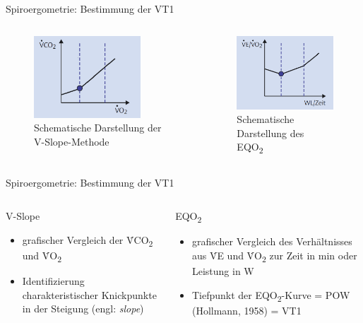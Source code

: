 \documentclass[colorBG,slideColor,9pt]{beamer}
\newcommand{\eqotwo}{EQO\textsubscript{2}}
\newcommand{\votwo}{\.{V}O\textsubscript{2}}
\newcommand{\vcotwo}{\.{V}CO\textsubscript{2}}
\newcommand{\ve}{\.{V}E}
\begin{document}
\begin{frame}{Spiroergometrie: Bestimmung der VT1}
\begin{columns}
\begin{column}{5cm}
\begin{figure}[H]
\begin{center}
\includegraphics[width=40mm]{Bilder/vslope.png}
\caption{Schematische Darstellung der V-Slope-Methode}
\end{center}
\end{figure}
\end{column}
\begin{column}{5cm}
\begin{figure}[H]
\begin{center}
\includegraphics[width=40mm]{Bilder/eqo2.png}
\caption{Schematische Darstellung des \eqotwo}
\end{center}
\end{figure}
\end{column}
\end{columns}
\end{frame}

\begin{frame}{Spiroergometrie: Bestimmung der VT1}
\begin{columns}
\begin{column}[t]{5cm}
\begin{block}{V-Slope}
	\begin{itemize}
		\item grafischer Vergleich der \vcotwo{} und \votwo
		\item Identifizierung charakteristischer Knickpunkte in der Steigung (engl: \textsl{slope})
	\end{itemize}
\end{block}
\end{column}
\begin{column}[t]{5cm}
\begin{block}{\eqotwo}
	\begin{itemize}
		\item grafischer Vergleich des Verhältnisses aus \ve{} und \votwo{} zur Zeit in \si{\minute} oder Leistung in \si{\watt}
		\item Tiefpunkt der \eqotwo-Kurve = POW (Hollmann, 1958) = VT1
	\end{itemize}
\end{block}
\end{column}
\end{columns}
\end{frame}
\end{document}
